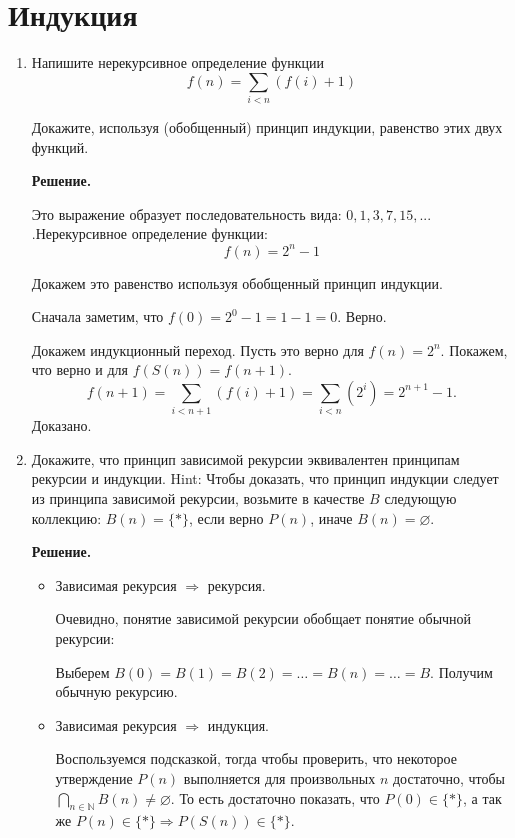 \section{Индукция}
\begin{enumerate}

\item Напишите нерекурсивное определение функции \[ f(n) = \sum_{i < n} (f(i) + 1) \]

Докажите, используя (обобщенный) принцип индукции, равенство этих двух функций.

\textbf{Решение.} 

Это выражение образует последовательность вида: $0, 1, 3, 7, 15,...$ .Нерекурсивное определение функции: 
\begin{equation*}
f(n) = 2^n - 1
\end{equation*}

Докажем это равенство используя обобщенный принцип индукции.

Сначала заметим, что $f(0) = 2^0 - 1 = 1 - 1 = 0$. Верно.

Докажем индукционный переход. Пусть это верно для $f(n) = 2^n$. Покажем, что верно и для $f(S(n)) = f(n + 1)$.
\begin{equation*}
f(n + 1) = \sum_{i < n + 1} (f(i) + 1) = \sum_{i<n}(2^i) = 2^{n + 1} - 1.
\end{equation*}
Доказано.

\item Докажите, что принцип зависимой рекурсии эквивалентен принципам рекурсии и индукции. Hint: Чтобы 
доказать, что принцип индукции следует из принципа зависимой рекурсии, возьмите в качестве $B$ следующую 
коллекцию: $B(n) = \{ * \}$, если верно $P(n)$, иначе $B(n) = \varnothing$.
    
\textbf{Решение.}

\begin{itemize}
	\item Зависимая рекурсия $\Rightarrow$ рекурсия.
	
	Очевидно, понятие зависимой рекурсии обобщает понятие обычной рекурсии:
	
	Выберем $B(0) = B(1) = B(2) = \ldots = B(n) = \ldots = B$. Получим обычную рекурсию.
	
	\item Зависимая рекурсия $\Rightarrow$ индукция.
	
	Воспользуемся подсказкой, тогда чтобы проверить, что некоторое утверждение $P(n)$ выполняется для 	
	произвольных $n$ достаточно, чтобы $\bigcap\limits_{n\in \mathbb{N}} B(n) \neq \varnothing$. То есть 
	достаточно показать, что $P(0)\in \{*\}$, а так же $P(n) \in \{*\} \Rightarrow P(S(n)) \in \{*\}$.
	

\end{itemize}
\end{enumerate}
